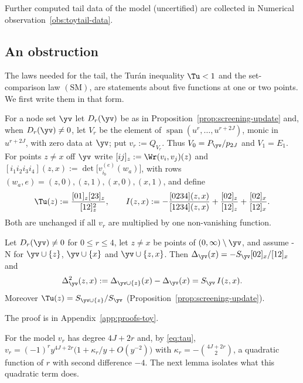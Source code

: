 Further computed tail data of the model (uncertified) are collected in Numerical observation~\ref{obs:toytail-data}.

\subsection{An obstruction}\label{ssec:toy-obstruction}

The laws needed for the tail, the Tur\'an inequality $\Tu<1$ and the set-comparison law $(\mathrm{SM})$, are
statements about five functions at one or two points. We first write them in that form.

For a node set $\yv$ let $D_r(\yv)$ be as in Proposition~\ref{prop:screening-update} and, when $D_r(\yv)\neq0$, let
$V_r$ be the element of $\operatorname{span}(u^r,\dots,u^{r+2J})$, monic in $u^{r+2J}$, with zero data at $\yv$; put
$v_r:=Q_{V_r}$. Thus $V_0=P_{\yv}/p_{2J}$ and $V_1=E_1$. For points $z\neq x$ off $\yv$ write
$[ij]_z:=\Wr(v_i,v_j)(z)$ and $[i_1i_2i_3i_4](z,x):=\det\bigl[v_{i_b}^{(e)}(w_a)\bigr]$, with rows
$(w_a,e)=(z,0),(z,1),(x,0),(x,1)$, and define
\[
  \Tu(z):=\frac{[01]_z[23]_z}{[12]_z^2},\qquad
  I(z,x):=-\frac{[0234](z,x)}{[1234](z,x)}+\frac{[02]_z}{[12]_z}+\frac{[02]_x}{[12]_x}.
\]
Both are unchanged if all $v_r$ are multiplied by one non-vanishing function.

\begin{lemma}\label{lem:selfsim}
Let $D_r(\yv)\neq0$ for $0\le r\le4$, let $z\neq x$ be points of $(0,\infty)\setminus\yv$, and assume \hyp{N} for
$\yv\cup\{z\}$, $\yv\cup\{x\}$ and $\yv\cup\{z,x\}$. Then $\Delta_{\yv}(x)=-S_{\yv}[02]_x/[12]_x$ and
\[
  \Delta^2_{\yv}(z,x):=\Delta_{\yv\cup\{z\}}(x)-\Delta_{\yv}(x)=S_{\yv}\,I(z,x).
\]
Moreover $\Tu(z)=S_{\yv\cup\{z\}}/S_{\yv}$ \textup{(}Proposition~\ref{prop:screening-update}\textup{)}.
\end{lemma}

The proof is in Appendix~\ref{app:proofs-toy}.

For the model $v_r$ has degree $4J+2r$ and, by \eqref{eq:tau}, $v_r=(-1)^ry^{4J+2r}\bigl(1+\kappa_r/y+O(y^{-2})\bigr)$ with
$\kappa_r=-\binom{4J+2r}{2}$, a quadratic function of $r$ with second difference $-4$. The next lemma isolates what
this quadratic term does.

